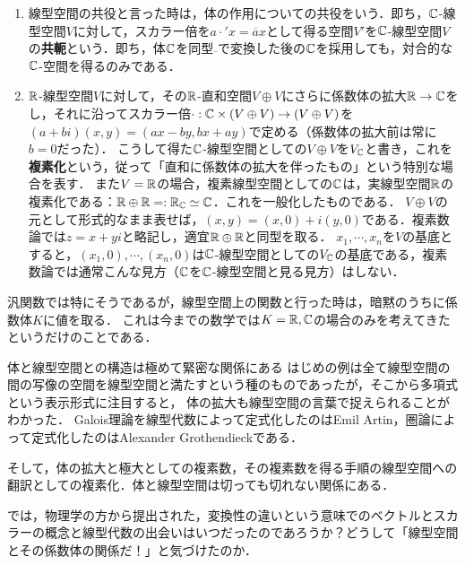 \documentclass[uplatex, 12pt, dvipdfmx]{jsreport}
\begin{document}
\begin{example}\mbox{}
    \begin{enumerate}
        \item 線型空間の共役と言った時は，体の作用についての共役をいう．即ち，$\mathbb{C}$-線型空間$V$に対して，スカラー倍を$a\cdot'x=\overline{a}x$として得る空間$V'$を$\mathbb{C}$-線型空間$V$の\textbf{共軛}という．即ち，体$\mathbb{C}$を同型$\overline{ }$で変換した後の$\mathbb{C}$を採用しても，対合的な$\mathbb{C}$-空間を得るのみである．
        \item $\mathbb{R}$-線型空間$V$に対して，その$\mathbb{R}$-直和空間$V\oplus V$にさらに係数体の拡大$\mathbb{R}\to\mathbb{C}$をし，それに沿ってスカラー倍$\cdot:\mathbb{C}\times(V\oplus V)\to (V\oplus V)$を$(a+bi)(x,y)=(ax-by,bx+ay)$で定める（係数体の拡大前は常に$b=0$だった）．
        こうして得た$\mathbb{C}$-線型空間としての$V\oplus V$を$V_{\mathbb{C}}$と書き，これを\textbf{複素化}という，従って「直和に係数体の拡大を伴ったもの」という特別な場合を表す．
        また$V=\mathbb{R}$の場合，複素線型空間としての$\mathbb{C}$は，実線型空間$\mathbb{R}$の複素化である：$\mathbb{R}\oplus\mathbb{R}=:\mathbb{R}_{\mathbb{C}}\simeq\mathbb{C}$．これを一般化したものである．
        $V\oplus V$の元として形式的なまま表せば，$(x,y)=(x,0)+i(y,0)$である．複素数論では$z=x+yi$と略記し，適宜$\mathbb{R}\oplus\mathbb{R}$と同型を取る．
        $x_1,\cdots,x_n$を$V$の基底とすると，$(x_1,0),\cdots,(x_n,0)$は$\mathbb{C}$-線型空間としての$V_{\mathbb{C}}$の基底である，複素数論では通常こんな見方（$\mathbb{C}$を$\mathbb{C}$-線型空間と見る見方）はしない．
    \end{enumerate}
\end{example}

\begin{remark}
    汎関数では特にそうであるが，線型空間上の関数と行った時は，暗黙のうちに係数体$K$に値を取る．
    これは今までの数学では$K=\mathbb{R},\mathbb{C}$の場合のみを考えてきたというだけのことである．
\end{remark}

\begin{itembox}[l]{体と線型空間との構造は極めて緊密な関係にある}
    はじめの例は全て線型空間の間の写像の空間を線型空間と満たすという種のものであったが，そこから多項式という表示形式に注目すると，
    体の拡大も線型空間の言葉で捉えられることがわかった．
    Galois理論を線型代数によって定式化したのはEmil Artin，圏論によって定式化したのはAlexander Grothendieckである．

    そして，体の拡大と極大としての複素数，その複素数を得る手順の線型空間への翻訳としての複素化．体と線型空間は切っても切れない関係にある．

    では，物理学の方から提出された，変換性の違いという意味でのベクトルとスカラーの概念と線型代数の出会いはいつだったのであろうか？どうして「線型空間とその係数体の関係だ！」と気づけたのか．
\end{itembox}
\end{document}
